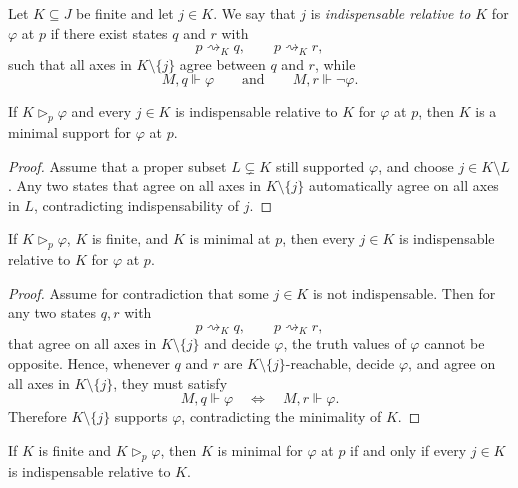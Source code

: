 \begin{definition}[Indispensability]\label{def:axis-indispensability}
Let $K\subseteq J$ be finite and let $j\in K$. We say that $j$ is \emph{indispensable relative to $K$} for $\varphi$ at $p$ if there exist states $q$ and $r$ with
\[
p\rightsquigarrow_K q,\qquad
p\rightsquigarrow_K r,
\]
such that all axes in $K\setminus\{j\}$ agree between $q$ and $r$, while
\[
M,q\Vdash\varphi
\qquad\text{and}\qquad
M,r\Vdash\neg\varphi.
\]
\end{definition}

\begin{proposition}\label{prop:indispensability-implies-minimality}
If $K\triangleright_p\varphi$ and every $j\in K$ is indispensable relative to $K$ for $\varphi$ at $p$, then $K$ is a minimal support for $\varphi$ at $p$.
\end{proposition}

\begin{proof}
Assume that a proper subset $L\subsetneq K$ still supported $\varphi$, and choose $j\in K\setminus L$. Any two states that agree on all axes in $K\setminus\{j\}$ automatically agree on all axes in $L$, contradicting indispensability of $j$.
\end{proof}

\begin{proposition}\label{prop:minimality-implies-indispensability}
If $K\triangleright_p\varphi$, $K$ is finite, and $K$ is minimal at $p$, then every $j\in K$ is indispensable relative to $K$ for $\varphi$ at $p$.
\end{proposition}

\begin{proof}
Assume for contradiction that some $j\in K$ is not indispensable. Then for any two states $q,r$ with
\[
p\rightsquigarrow_K q,\qquad
p\rightsquigarrow_K r,
\]
that agree on all axes in $K\setminus\{j\}$ and decide $\varphi$, the truth values of $\varphi$ cannot be opposite.
Hence, whenever $q$ and $r$ are $K\setminus\{j\}$-reachable, decide $\varphi$, and agree on all axes in $K\setminus\{j\}$, they must satisfy
\[
M,q\Vdash\varphi
\quad\Longleftrightarrow\quad
M,r\Vdash\varphi.
\]
Therefore $K\setminus\{j\}$ supports $\varphi$, contradicting the minimality of $K$.
\end{proof}

\begin{corollary}\label{cor:minimal-support-characterization}
If $K$ is finite and $K\triangleright_p\varphi$, then $K$ is minimal for $\varphi$ at $p$ if and only if every $j\in K$ is indispensable relative to $K$.
\end{corollary}

